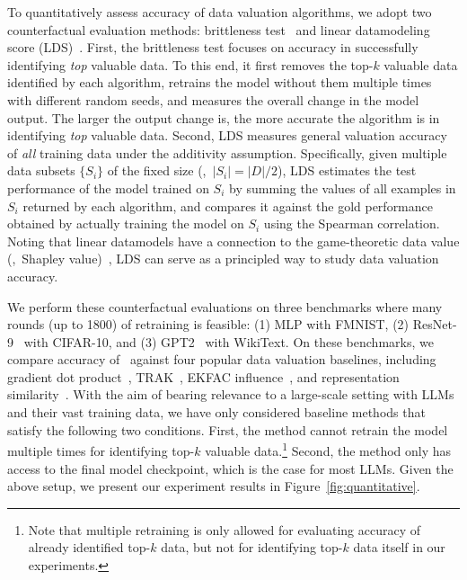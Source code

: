To quantitatively assess accuracy of data valuation algorithms, we adopt two counterfactual evaluation methods: brittleness test~\cite{ilyas2022datamodels} and linear datamodeling score (LDS)~\cite{park2023trak}. First, the brittleness test focuses on accuracy in successfully identifying \textit{top} valuable data. To this end, it first removes the top-$k$ valuable data identified by each algorithm, retrains the model without them multiple times with different random seeds, and measures the overall change in the model output. The larger the output change is, the more accurate the algorithm is in identifying \textit{top} valuable data. Second, LDS measures general valuation accuracy of \textit{all} training data under the additivity assumption. Specifically, given multiple data subsets $\{S_i\}$ of the fixed size (\eg,\ $|S_i|=|D|/2$), LDS estimates the test performance of the model trained on $S_i$ by summing the values of all examples in $S_i$ returned by each algorithm, and compares it against the gold performance obtained by actually training the model on $S_i$ using the Spearman correlation. Noting that linear datamodels have a connection to the game-theoretic data value (\eg,\ Shapley value)~\cite{ilyas2022datamodels}, LDS can serve as a principled way to study data valuation accuracy.

We perform these counterfactual evaluations on three benchmarks where many rounds (up to 1800) of retraining is feasible: (1) MLP with FMNIST, (2) ResNet-9~\cite{he2016deep} with CIFAR-10, and (3) GPT2~\cite{radford2019language} with WikiText. On these benchmarks, we compare accuracy of \method\ against four popular data valuation baselines, including gradient dot product~\cite{pruthi2020estimating}, TRAK~\cite{park2023trak}, EKFAC influence~\cite{grosse2023studying}, and representation similarity~\cite{hanawa2020evaluation}. With the aim of bearing relevance to a large-scale setting with LLMs and their vast training data, we have only considered baseline methods that satisfy the following two conditions. First, the method cannot retrain the model multiple times for identifying top-$k$ valuable data.\footnote{Note that multiple retraining is only allowed for evaluating accuracy of already identified top-$k$ data, but not for identifying top-$k$ data itself in our experiments.} Second, the method only has access to the final model checkpoint, which is the case for most LLMs. Given the above setup, we present our experiment results in Figure~\ref{fig:quantitative}.

